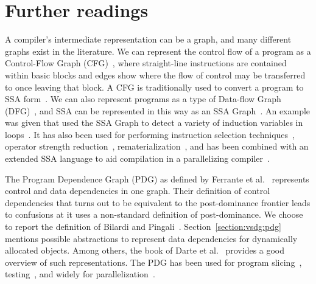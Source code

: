 {\section{Further readings}
A compiler's intermediate representation can be a graph, and many different graphs exist in the literature. 
We can represent the control flow of a program as a Control-Flow Graph (CFG)~\cite{Alle70}, where straight-line instructions are contained within basic blocks and edges show where the flow of control may be transferred to once leaving that block. 
A CFG is traditionally used to convert a program to SSA form~\cite{Cytron:1991:TOPLAS}. 
We can also represent programs as a type of Data-flow Graph (DFG)~\cite{dennis74first,dennis80data}, and SSA can be represented in this way as an SSA Graph~\cite{504710}. 
An example was given that used the SSA Graph to detect a variety of induction variables in loops~\cite{Wolfe92,Ger95}. 
It has also been used for performing instruction selection techniques~\cite{1375663,1269857}, operator strength reduction~\cite{504710}, rematerialization~\cite{rematerialization}, and has been combined with an extended SSA language to aid compilation in a parallelizing compiler~\cite{Stoltzextendedssa}.

The Program Dependence Graph (PDG) as defined by Ferrante et al.~\cite{ferrantePDG} represents control and data dependencies in one graph. 
Their definition of control dependencies that turns out to be equivalent to the post-dominance frontier leads to confusions at it uses a non-standard definition of post-dominance. 
We choose to report the definition of Bilardi and Pingali~\cite{Bilardi1996}. 
Section~\ref{section:vsdg:pdg} mentions possible abstractions to represent data dependencies for dynamically allocated objects. 
Among others, the book of Darte et al.~\cite{DarteRV-book} provides a good overview of such representations. 
The PDG has been used for program slicing~\cite{ottenstein84program}, testing~\cite{bates93incremental}, and widely for parallelization~\cite{ferrante85on,ferrante88generating,simons90a,baxter89program}. 

}
